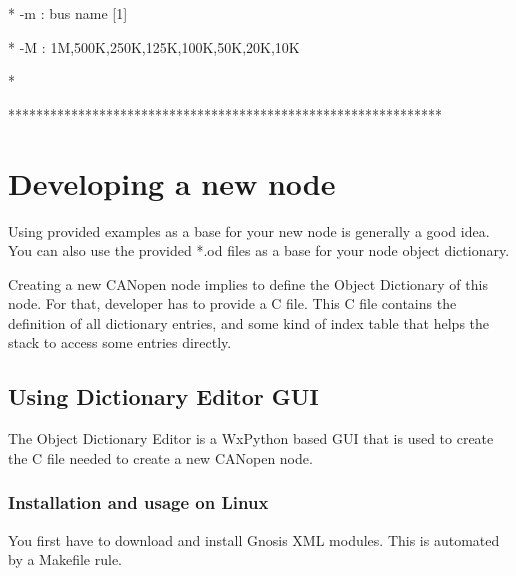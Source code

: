 \documentclass[a4paper,12pt]{book}
\newcommand{\canopen}{CANopen}
\begin{document}
{\ttfamily
* \space \space \space \space {}-m : bus name [{\textquotedbl}1{\textquotedbl}]
\space \space \space \space \space \space \space \space \space \space \space \space \space \space \space \space \space \space \space \space \space \space \space \space \space \space \space \space \space \space \space \space \space \space \space *}

{\ttfamily
* \space \space \space \space {}-M : 1M,500K,250K,125K,100K,50K,20K,10K
\space \space \space \space \space \space \space \space \space \space \space \space \space \space \space *}

{\ttfamily
*
\space \space \space \space \space \space \space \space \space \space \space \space \space \space \space \space \space \space \space \space \space \space \space \space \space \space \space \space \space \space \space \space \space \space \space \space \space \space \space \space \space \space \space \space \space \space \space \space \space \space \space \space \space \space \space \space \space \space \space *}

{\ttfamily
**************************************************************}

\section{Developing a new node}
Using provided examples as a base for your new node is generally a good
idea. You can also use the provided *.od files as a base for your node
object dictionary.

Creating a new \canopen{} node implies to define the Object Dictionary of
this node. For that, developer has to provide a C file. This C file
contains the definition of all dictionary entries, and some kind of
index table that helps the stack to access some entries directly.

\subsection{Using Dictionary Editor GUI}
The Object Dictionary Editor is a WxPython based GUI that is used to
create the C file needed to create a new \canopen{} node. 

\subsubsection{Installation and usage on Linux}
You first have to download and install Gnosis XML modules. This is
automated by a Makefile rule.
\end{document}
